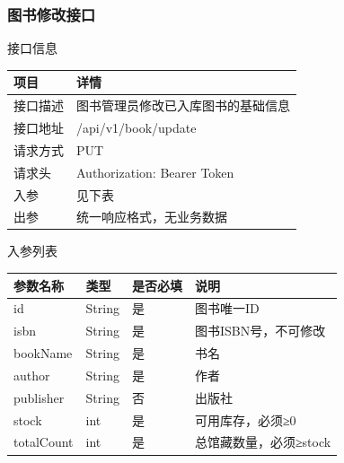 \documentclass[12pt, a4paper]{article}
\begin{document}
\newpage
\subsubsection{图书修改接口}
\begin{center}
    接口信息
\end{center}
\begin{table}[H]
    \centering
    \begin{tabular}{|l|l|}
        \hline
        项目 & 详情 \\
        \hline
        接口描述 & 图书管理员修改已入库图书的基础信息 \\
        \hline
        接口地址 & /api/v1/book/update \\
        \hline
        请求方式 & PUT \\
        \hline
        请求头 & Authorization: Bearer {Token} \\
        \hline
        入参 & 见下表 \\
        \hline
        出参 & 统一响应格式，无业务数据 \\
        \hline
    \end{tabular}
\end{table}

入参列表

\begin{table}[H]
    \centering
    \begin{tabular}{|l|l|l|l|}
        \hline
        参数名称 & 类型 & 是否必填 & 说明 \\
        \hline
        id & String & 是 & 图书唯一ID \\
        \hline
        isbn & String & 是 & 图书ISBN号，不可修改 \\
        \hline
        bookName & String & 是 & 书名 \\
        \hline
        author & String & 是 & 作者 \\
        \hline
        publisher & String & 否 & 出版社 \\
        \hline
        stock & int & 是 & 可用库存，必须≥0 \\
        \hline
        totalCount & int & 是 & 总馆藏数量，必须≥stock \\
        \hline
    \end{tabular}
\end{table}
\end{document}
